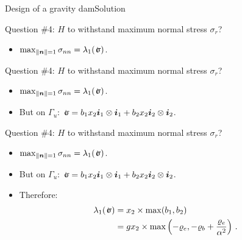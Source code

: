 \documentclass{beamer}
\newcommand{\xj}{x}
\renewcommand{\ij}{i}
\newcommand{\iv}{{\boldsymbol\ij}}
\newcommand{\nj}{n}
\newcommand{\nv}{{\boldsymbol\nj}}
\newcommand{\roi}{\varrho}
\newcommand*{\stressj}{\sigma}
\newcommand{\stress}{\mbox{$\hspace{0.3em}\rotatebox[x=0pt,y=0.2pt]{90}{\rule{0.017\linewidth}{0.4pt}}\hspace{-0.25em}\upsigma$}}
\newcommand{\norm}[1]{\left\|#1\right\|}
\begin{document}
\begin{frame}{Design of a gravity dam}{Solution}

\begin{overprint}

\vskip-20pt
\begin{exampleblock}{Question \#4: $H$ to withstand maximum normal stress $\stressj_r$?}
\begin{itemize}
\item $\max_{\norm{\nv}=1}\stressj_{\nj\nj}=\lambda_1(\stress)$.
\end{itemize}
\end{exampleblock}

\vskip-20pt
\begin{exampleblock}{Question \#4: $H$ to withstand maximum normal stress $\stressj_r$?}
\begin{itemize}
\item $\max_{\norm{\nv}=1}\stressj_{\nj\nj}=\lambda_1(\stress)$.
\item But on $\Gamma_u$: $\stress=b_1\xj_2\iv_1\otimes\iv_1 + b_2\xj_2\iv_2\otimes\iv_2$.
\end{itemize}
\end{exampleblock}

\vskip-20pt
\begin{exampleblock}{Question \#4: $H$ to withstand maximum normal stress $\stressj_r$?}
\begin{itemize}
\item $\max_{\norm{\nv}=1}\stressj_{\nj\nj}=\lambda_1(\stress)$.
\item But on $\Gamma_u$: $\stress=b_1\xj_2\iv_1\otimes\iv_1 + b_2\xj_2\iv_2\otimes\iv_2$.
\item Therefore:
\begin{displaymath}
\begin{split}
\lambda_1(\stress) &=\xj_2\times\max(b_1,b_2) \\
&=g\xj_2\times\max\left(-\roi_e, -\roi_b+\frac{\roi_e}{\alpha^2}\right)\,.
\end{split}
\end{displaymath}
\end{itemize}
\end{exampleblock}


\end{overprint}
\end{frame}
\end{document}
